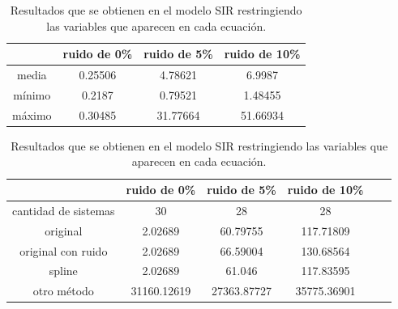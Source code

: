 \begin{table}[!h]
    \centering
    \caption{Resultados que se obtienen en el modelo SIR restringiendo las variables que aparecen en cada ecuación.}
    \begin{tabular}{|c|c|c|c|}
        \hline
               & \textbf{ruido de 0\%} & \textbf{ruido de 5\%} & \textbf{ruido de 10\%} \\
        \hline
        media  & 0.25506               & 4.78621               & 6.9987                 \\
        \hline
        mínimo & 0.2187                & 0.79521               & 1.48455                \\
        \hline
        máximo & 0.30485               & 31.77664              & 51.66934               \\
        \hline
    \end{tabular}

    \begin{tabular}{|c|c|c|c|c|c|}
        \hline
                             & \textbf{ruido de 0\%} & \textbf{ruido de 5\%} & \textbf{ruido de 10\%} \\
        \hline
        cantidad de sistemas & 30                    & 28                    & 28                     \\
        \hline
        original             & 2.02689               & 60.79755              & 117.71809              \\
        \hline
        original con ruido   & 2.02689               & 66.59004              & 130.68564              \\
        \hline
        spline               & 2.02689               & 61.046                & 117.83595              \\
        \hline
        otro método          & 31160.12619           & 27363.87727           & 35775.36901            \\
        \hline
    \end{tabular}
    \label{table:experiment_SIR}
\end{table}

